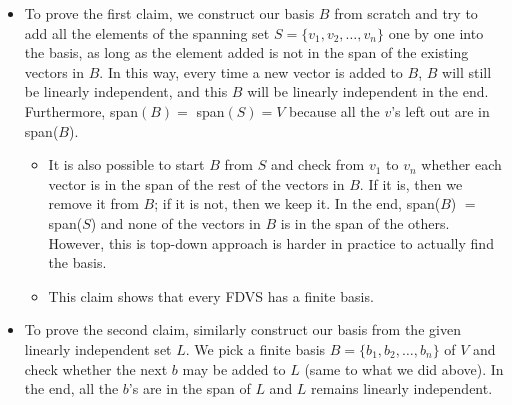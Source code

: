 \documentclass{article}
\begin{document}
\begin{itemize}
\begin{itemize}
        \item To prove the first claim, we construct our basis $B$ from scratch and try to add all the elements of the spanning set $S = \{v_1, v_2, \dots, v_n\}$ one by one into the basis, as long as the element added is not in the span of the existing vectors in $B$. In this way, every time a new vector is added to $B$, $B$ will still be linearly independent, and this $B$ will be linearly independent in the end. Furthermore, span$(B) = $ span$(S) = V$ because all the $v$'s left out are in span($B$).
        \begin{itemize}
            \item It is also possible to start $B$ from $S$ and check from $v_1$ to $v_n$ whether each vector is in the span of the rest of the vectors in $B$. If it is, then we remove it from $B$; if it is not, then we keep it. In the end, span($B$) $=$ span($S$) and none of the vectors in $B$ is in the span of the others. However, this is top-down approach is harder in practice to actually find the basis.
            \item This claim shows that every FDVS has a finite basis.
        \end{itemize}
        \item To prove the second claim, similarly construct our basis from the given linearly independent set $L$. We pick a finite basis $B = \{b_1, b_2,\dots,b_n\}$ of $V$ and check whether the next $b$ may be added to $L$ (same to what we did above). In the end, all the $b$'s are in the span of $L$ and $L$ remains linearly independent.
    \end{itemize}
    

\end{itemize}
\end{document}
